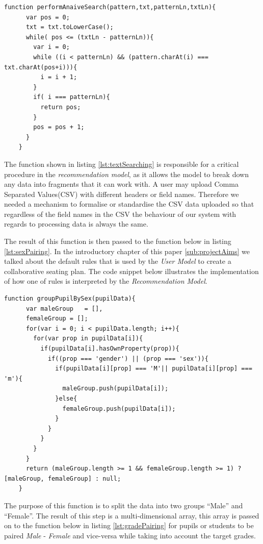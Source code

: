 \begin{lstlisting}[caption={Text Searching using Naive Search Technique}, label={lst:textSearching}]
    function performAnaiveSearch(pattern,txt,patternLn,txtLn){
      var pos = 0;
      txt = txt.toLowerCase();
      while( pos <= (txtLn - patternLn)){
        var i = 0;
        while ((i < patternLn) && (pattern.charAt(i) === txt.charAt(pos+i))){
          i = i + 1;
        }
        if( i === patternLn){
          return pos;
        }
        pos = pos + 1;
      }
    }
\end{lstlisting}
The function shown in listing \ref{lst:textSearching} is responsible for a critical procedure in the \emph{recommendation model}, as it allows the model to break down any data into fragments that it can work with. A user may upload Comma Separated Values(CSV) with different headers or field names. Therefore we needed a mechanism to formalise or standardise the CSV data uploaded so that regardless of the field names in the CSV the behaviour of our system with regards to processing data is always the same.

The result of this function is then passed to the function below in listing \ref{lst:sexPairing}. In the introductory chapter of this paper  \ref{sub:projectAims} we talked about the default rules that is used by the \emph{User Model} to create a collaborative seating plan. The code snippet below illustrates the implementation of how one of rules is interpreted by the \emph{Recommendation Model}. 

\begin{lstlisting}[caption={group by sex}, label={lst:sexPairing}]
    function groupPupilBySex(pupilData){
      var maleGroup   = [],
      femaleGroup = [];
      for(var i = 0; i < pupilData.length; i++){
        for(var prop in pupilData[i]){
          if(pupilData[i].hasOwnProperty(prop)){
            if((prop === 'gender') || (prop === 'sex')){
              if(pupilData[i][prop] === 'M'|| pupilData[i][prop] === 'm'){
                maleGroup.push(pupilData[i]);
              }else{
                femaleGroup.push(pupilData[i]);
              }
            }
          }
        }
      }
      return (maleGroup.length >= 1 && femaleGroup.length >= 1) ? [maleGroup, femaleGroup] : null;
    }
\end{lstlisting}
The purpose of this function is to split the data into two groups ``Male'' and ``Female''. The result of this step is a multi-dimensional array, this array is passed on to the function below in listing \ref{lst:gradePairing} for pupils or students to be paired \emph{Male} - \emph{Female} and vice-versa while taking into account the target grades. 

